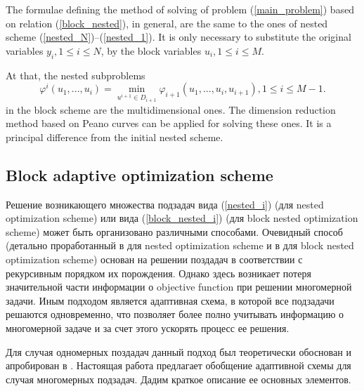 \documentclass[runningheads]{llncs}
\begin{document}
The formulae defining the method of solving of problem (\ref{main_problem}) 
based on relation (\ref{block_nested}), in general, are the same to the ones 
of nested scheme (\ref{nested_N})--(\ref{nested_1}). It is only necessary to 
substitute the original variables $y_i, 1\leq i \leq N$,  by the block 
variables $u_i, 1\leq i \leq M$. 

At that, the nested subproblems 
\begin{equation}\label{block_nested_i}
\varphi^i(u_1,...,u_i) = \min_{u^{i+1}\in D_{i+1}} \varphi_{i+1}(u_1,...,u_i,u
_{i+1}), 1\leq i\leq M-1.
\end{equation}
in the block scheme are the multidimensional ones. The dimension reduction 
method based on Peano curves can be applied for solving these ones. It is a 
principal difference from the initial nested scheme. 

\subsection{Block adaptive optimization scheme}
\Russian
Решение возникающего множества подзадач вида (\ref{nested_i}) (для nested optimization scheme) или вида (\ref{block_nested_i}) (для block nested optimization scheme) может быть организовано различными способами. 
Очевидный способ (детально проработанный в \cite{Grishagin2001,Grishagin2015} для nested optimization scheme и в \cite{Barkalov2014,Barkalov2016} для block nested optimization scheme) основан на решении поздадач в соответствии с рекурсивным порядком их порождения. Однако здесь возникает потеря значительной части информации о objective function при решении многомерной задачи. Иным  подходом является адаптивная схема, в которой все подзадачи решаются одновременно, что позволяет более полно учитывать информацию о многомерной задаче и за счет этого ускорять процесс ее решения.

Для случая одномерных поздадач данный подход был теоретически обоснован и апробирован в \cite{Grishagin2016,Grishagin2016_1,Grishagin2018}. Настоящая работа предлагает обобщение адаптивной схемы для случая многомерных подзадач. Дадим краткое описание ее основных элементов.
\end{document}
